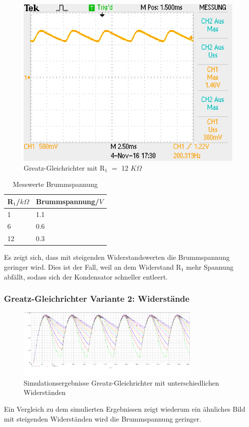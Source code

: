 \begin{figure}
\begin{center}
\includegraphics[scale=0.7]{bilder/Versuch2/12widerstand}
\caption{Greatz-Gleichrichter mit R$_1$ $=$ 12 $K \Omega$}
\end{center}
\end{figure}
\begin{table}[!h]
\begin{center}
\caption{Messwerte Brummspannung}
\begin{tabular}{|l|l|}\hline
R$_1$/$k\Omega$ & Brummspannung/$V$ \\
\hline
1 & 1.1 \\
\hline
6 & 0.6 \\
\hline
12 & 0.3 \\
\hline

\end{tabular}
\end{center}
\end{table}
\noindent
Es zeigt sich, dass mit steigenden Widerstandswerten die Brummspannung geringer wird. Dies ist der Fall, weil an dem Widerstand R$_1$ mehr Spannung abf\"allt, sodass sich der Kondensator schneller entleert. 
\subsubsection{Greatz-Gleichrichter Variante 2: Widerst\"ande}
\begin{figure}[ht]
\begin{center}
\includegraphics[width=0.8\textwidth]{Versuch3-SimulationmitVariablenWiderstand}
\caption{Simulationsergebnisse Greatz-Gleichrichter mit unterschiedlichen Widerst\"anden}
\end{center}
\end{figure}
\noindent
Ein Vergleich zu dem simulierten Ergebnissen zeigt wiederum ein \"ahnliches Bild mit steigenden Widerst\"anden wird die Brummspannung geringer. 
